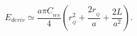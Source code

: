 \begin{equation}
E_{deriv}\simeq \frac{a\pi C_{_{WS}}}{4}\left(
r_{_{Q}}^{2}+\frac{2r_{_{Q}}}{a}+\frac{2L}{a^{2}}\right) .
\end{equation}

